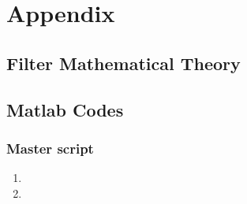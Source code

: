 \graphicspath{{figure_Appendix/}}%

\section{Appendix}
\subsection{Filter Mathematical Theory}\label{sec:appendix}
\subsection{Matlab Codes}
\subsubsection{Master script}


\begin{enumerate}
\item 
\item
\end{enumerate}